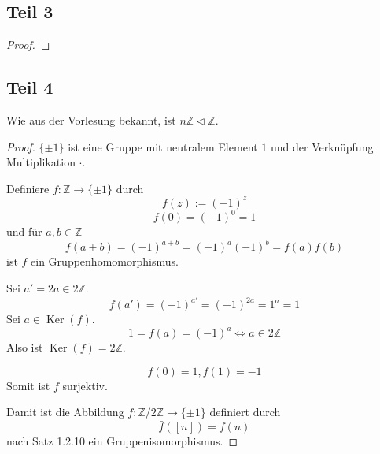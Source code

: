 \documentclass[10pt,a4paper]{article}
\DeclareMathOperator{\Ker}{Ker}
\begin{document}
\subsection{Teil 3}

\begin{proof}

\end{proof}

\subsection{Teil 4}

Wie aus der Vorlesung bekannt, ist $n \mathbb{Z} \triangleleft \mathbb{Z}$.

\begin{proof}
  $\{ \pm 1 \}$ ist eine Gruppe mit neutralem Element $1$ und der Verknüpfung Multiplikation $\cdot$.

  Definiere $f : \mathbb{Z} \rightarrow \{ \pm 1 \}$ durch
  \begin{equation}
    f(z) := (-1)^{z}
  \end{equation}
  \begin{equation}
    f(0) = (-1)^{0} = 1
  \end{equation}
  und für $a, b \in \mathbb{Z}$
  \begin{equation}
    f(a + b) = (-1)^{a + b} = (-1)^{a}(-1)^{b} = f(a)f(b)
  \end{equation}
  ist $f$ ein Gruppenhomomorphismus.

  Sei $a' = 2a \in 2 \mathbb{Z}$.
  \begin{equation}
    f(a') = (-1)^{a'} = (-1)^{2a} = 1^{a} = 1
  \end{equation}
  Sei $a \in \Ker(f)$.
  \begin{equation}
    1 = f(a) = (-1)^{a} \Leftrightarrow a \in 2 \mathbb{Z}
  \end{equation}
  Also ist $\Ker(f) = 2 \mathbb{Z}$.

  \begin{equation}
    f(0) = 1, f(1) = -1
  \end{equation}
  Somit ist $f$ surjektiv.

  Damit ist die Abbildung $\bar{f} : \mathbb{Z} / 2 \mathbb{Z} \rightarrow \{ \pm 1 \}$ definiert durch
  \begin{equation}
    \bar{f}([n]) = f(n)
  \end{equation}
  nach Satz 1.2.10 ein Gruppenisomorphismus.
\end{proof}
\end{document}
